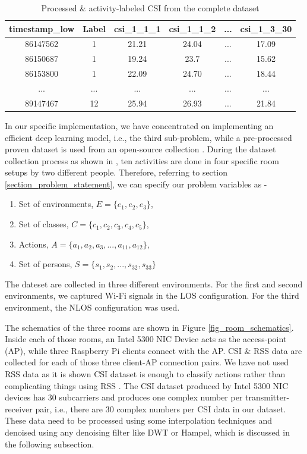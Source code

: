 \documentclass[conference]{IEEEtran}
\begin{document}
\begin{table}
    \begin{tabular}{| c | c |c | c | c| c|} 
     \hline
     timestamp\_low & Label & csi\_1\_1\_1 & csi\_1\_1\_2 & ... & csi\_1\_3\_30\\ [0.2ex]
     \hline\hline
     86147562 & 1  & 21.21 & 24.04 & ... & 17.09 \\ [1ex]
     \hline
     86150687 & 1  & 19.24 & 23.7  & ... & 15.62 \\ [1ex]
     \hline
     86153800 & 1  & 22.09 & 24.70 & ... & 18.44 \\ [1ex]
     \hline
     ... & ... &  ... &  ... & ... & ... \\ [1ex]
     \hline
     89147467 & 12 & 25.94 & 26.93 & ... & 21.84 \\ [1ex]
     \hline\hline
    \end{tabular}
\caption{\label{table:csi_processed}Processed \& activity-labeled CSI from the complete dataset}
\end{table}


In our specific implementation, we have concentrated on implementing an efficient deep learning model, i.e., the third sub-problem, while a pre-processed proven dataset is used from an open-source collection \cite{dataset}. During the dataset collection process as shown in \cite{dataset}, ten activities are done in four specific room setups by two different people.
Therefore, referring to section \ref{section_problem_statement}, we can specify our problem variables as -
\begin{enumerate}
\item Set of environments, $E = \{e_1, e_2, e_3\}$,
\item Set of classes, $C = \{c_1, c_2, c_3, c_4, c_5 \}$,
\item Actions, $A = \{a_1, a_2, a_3, ..., a_{11}, a_{12}\}$,
\item Set of persons, $S = \{s_1, s_2, ..., s_{32}, s_{33}\}$
\end{enumerate}


The dateset are collected in three different environments. For the first and second environments, we captured Wi-Fi signals in the LOS configuration. For the third environment, the NLOS configuration was used.

The schematics of the three rooms are shown in Figure \ref{fig_room_schematics}.  Inside each of those rooms, an Intel 5300 NIC Device \cite{intel_nic_device} acts as the access-point (AP), while three Raspberry Pi clients connect with the AP. CSI \& RSS data are collected for each of those three client-AP connection pairs. We have not used RSS data as it is shown CSI dataset is enough to classify actions rather than complicating things using RSS \cite{a1} \cite{a2} \cite{a3}. The CSI dataset produced by Intel 5300 NIC devices has 30 subcarriers and produces one complex number per transmitter-receiver pair, i.e., there are 30 complex numbers per CSI data in our dataset. These data need to be processed using some interpolation techniques and denoised using any denoising filter like DWT or Hampel, which is discussed in the following subsection.
\end{document}
